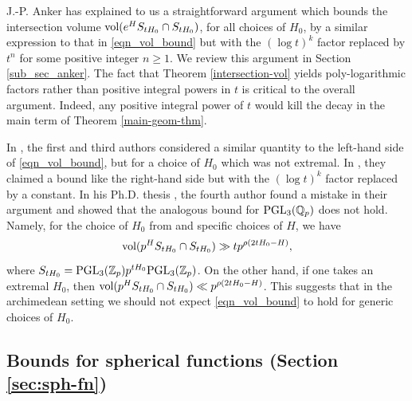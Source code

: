 \documentclass[12pt]{amsart}
\newtheorem{theorem}{Theorem}[section]
\theoremstyle{remark}
\newcommand{\Z}{\mathbb Z}
\newcommand{\Q}{\mathbb Q}
\newcommand{\ga}{\mathfrak a}
\begin{document}

J.-P. Anker has explained to us a straightforward argument which bounds the intersection volume $\textnormal{vol}(e^HS_{t H_0} \cap S_{t H_0})$, for all choices of $H_0$, by a similar expression to that in \eqref{eqn_vol_bound} but with the $(\log t)^k$ factor replaced by $t^n$ for some positive integer $n\geq 1$. We review this argument in Section \ref{sub_sec_anker}. The fact that Theorem \ref{intersection-vol} yields poly-logarithmic factors rather than positive integral powers in $t$ is critical to the overall argument. Indeed, any positive integral power of $t$ would kill the decay in the main term of Theorem \ref{main-geom-thm}.

In \cite{Brumley_Matz_23}, the first and third authors considered a similar quantity to the left-hand side of \eqref{eqn_vol_bound}, but for a choice of $H_0$ which was not extremal. In \cite[Lemma 5.8]{Brumley_Matz_23}, they claimed a bound like the right-hand side but with the $(\log t)^k$ factor replaced by a constant. In his Ph.D. thesis \cite{Peterson_thesis}, the fourth author found a mistake in their argument and showed that the analogous bound for ${\rm PGL}_3(\Q_p)$ does not hold. Namely, for the choice of $H_0$ from \cite{Brumley_Matz_23} and specific choices of $H$, we have
\[
\textnormal{vol}(p^H S_{t H_0} \cap S_{t H_0}) \gg t p^{\rho (2 t H_0 - H)},
\]
where $S_{t H_0} = \textnormal{PGL}_3(\Z_p) p^{t H_0} \textnormal{PGL}_3(\Z_p)$. On the other hand, if one takes an extremal $H_0$, then $\textnormal{vol}(p^H S_{t H_0} \cap S_{t H_0}) \ll p^{\rho(2 t H_0 - H)}$. This suggests that in the archimedean setting we should not expect \eqref{eqn_vol_bound} to hold for generic choices of $H_0$.

\subsection{Bounds for spherical functions (Section \ref{sec:sph-fn})}\label{intro-sph-bds}
\end{document}
